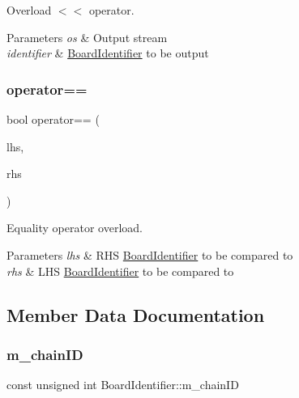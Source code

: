 Overload $<$$<$ operator. 


\begin{DoxyParams}{Parameters}
{\em os} & Output stream \\
\hline
{\em identifier} & \hyperlink{class_board_identifier}{Board\+Identifier} to be output \\
\hline
\end{DoxyParams}
\mbox{\label{class_board_identifier_a7e5f6b9a11fbed47acc7aeafab856eed}} 
\subsubsection{\texorpdfstring{operator==}{operator==}}
{\footnotesize\ttfamily bool operator== (\begin{DoxyParamCaption}\item[{const \hyperlink{class_board_identifier}{Board\+Identifier} \&}]{lhs,  }\item[{const \hyperlink{class_board_identifier}{Board\+Identifier} \&}]{rhs }\end{DoxyParamCaption})\hspace{0.3cm}{\ttfamily [friend]}}



Equality operator overload. 


\begin{DoxyParams}{Parameters}
{\em lhs} & R\+HS \hyperlink{class_board_identifier}{Board\+Identifier} to be compared to \\
\hline
{\em rhs} & L\+HS \hyperlink{class_board_identifier}{Board\+Identifier} to be compared to \\
\hline
\end{DoxyParams}


\subsection{Member Data Documentation}
\mbox{\label{class_board_identifier_a53a9a7c31a0316eed7932615b04293ff}} 
\subsubsection{\texorpdfstring{m\+\_\+chain\+ID}{m\_chainID}}
{\footnotesize\ttfamily const unsigned int Board\+Identifier\+::m\+\_\+chain\+ID\hspace{0.3cm}{\ttfamily [protected]}}

